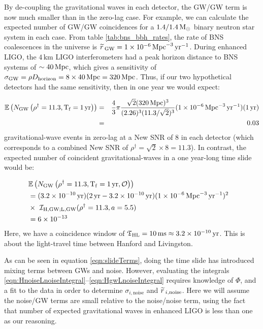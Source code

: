 By de-coupling the gravitational waves in each detector, the GW/GW term is now much smaller than in the zero-lag case. For example, we can calculate the expected number of GW/GW coincidences for a $1.4/1.4\,\mathrm{M_\odot}$ binary neutron star system in each case. From table \ref{tab:bns_bbh_rates}, the rate of \ac{BNS} coalescences in the universe is $\widetilde{r}\,_{\mathrm{GW}} = 1 \times 10^{-6} \,\mathrm{Mpc}^{-3}\,\mathrm{yr}^{-1}$. During enhanced \ac{LIGO}, the $4\,\mathrm{km}$ \ac{LIGO} interferometers had a peak horizon distance to \ac{BNS} systems of $\sim40\,\mathrm{Mpc}$, which gives a sensitivity of $\sigma_{\mathrm{GW}} = \rho D_{\mathrm{horizon}} = 8 \times 40\,\mathrm{Mpc} = 320\,\mathrm{Mpc}$. Thus, if our two hypothetical detectors had the same sensitivity, then in one year we would expect:

\begin{eqnarray}
\mathbb{E}\left( N_{\mathrm{GW}} \left( \rho^{\dagger}  =  11.3, \mathrm{T_f} = 1 \,\mathrm{yr} \right)\right) & = & \frac{4}{3} \pi \frac{\sqrt{2} (320\,\mathrm{Mpc})^3}{(2.26)^3 (11.3 / \sqrt{2})^3} (1 \times 10^{-6}\,\mathrm{Mpc}^{-3}\,\mathrm{yr^{-1}}) (1\,\mathrm{yr}) \nonumber \\
 & = & 0.03 \nonumber
\end{eqnarray}
gravitational-wave events in zero-lag at a New \ac{SNR} of $8$ in each detector (which corresponds to a combined New SNR of $\rho^\dagger = \sqrt{2} \times 8 = 11.3$). In contrast, the expected number of coincident gravitational-waves in a one year-long time slide would be:

\begin{align*}
\lefteqn{\Exptd\left( N_{\mathrm{GW}} \left(\rho^{\dagger} = 11.3, \Tf = 1\,\mathrm{yr}, \mathcal{O} \right) \right)} \\
 &= (3.2 \times 10^{-10}\yr) ( 2\yr - 3.2\times10^{-10}\yr ) (1\times10^{-6}\Mpc^{-3}\yr^{-1})^2 \\
 & \times ~ \mathcal{I}_{\mathrm{H,GW;L,GW}}(\rho^\dagger = 11.3, a = 5.5) \\
 &= 6 \times 10^{-13}
\end{align*}
Here, we have a coincidence window of $\mathfrak{T}_{\mathrm{H}\mathrm{L}} = 10\,\mathrm{ms} \approx 3.2\times10^{-10}\,\mathrm{yr}$. This is about the light-travel time between Hanford and Livingston.

As can be seen in equation \ref{eqn:slideTerms}, doing the time slide has introduced mixing terms between \acp{GW} and noise. However, evaluating the integrals \ref{eqn:HnoiseLnoiseIntegral}--\ref{eqn:HgwLnoiseIntegral} requires knowledge of $\Phi$, and a fit to the data in order to determine $\sigma_{i,\mathrm{noise}}$ and $\widetilde{r}\,_{i,\mathrm{noise}}$. Here we will assume the noise/GW terms are small relative to the noise/noise term, using the fact that number of expected gravitational waves in enhanced \ac{LIGO} is less than one as our reasoning. %


